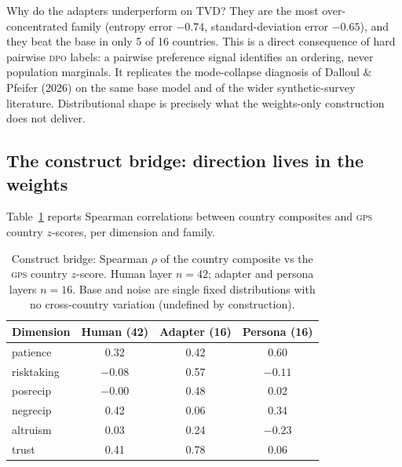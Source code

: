 \documentclass[10pt,letterpaper]{article}
\newcommand{\GPS}{\textsc{gps}}
\newcommand{\DPO}{\textsc{dpo}}
\begin{document}
Why do the adapters underperform on TVD? They are the most over-concentrated family (entropy error $-0.74$, standard-deviation error $-0.65$), and they beat the base in only 5 of 16 countries. This is a direct consequence of hard pairwise \DPO{} labels: a pairwise preference signal identifies an ordering, never population marginals. It replicates the mode-collapse diagnosis of Dalloul \& Pfeifer (2026) on the same base model and of the wider synthetic-survey literature. Distributional shape is precisely what the weights-only construction does not deliver.

\subsection{The construct bridge: direction lives in the weights}
Table~\ref{tab:res-bridge} reports Spearman correlations between country composites and \GPS{} country $z$-scores, per dimension and family.

\begin{table}[H]
\centering\small
\caption{Construct bridge: Spearman $\rho$ of the country composite vs the \GPS{} country $z$-score. Human layer $n=42$; adapter and persona layers $n=16$. Base and noise are single fixed distributions with no cross-country variation (undefined by construction).}\label{tab:res-bridge}
\begin{tabular}{lccc}
\toprule
Dimension & Human (42) & Adapter (16) & Persona (16)\\
\midrule
patience & 0.32 & 0.42 & 0.60\\
risktaking & $-0.08$ & 0.57 & $-0.11$\\
posrecip & $-0.00$ & 0.48 & 0.02\\
negrecip & 0.42 & 0.06 & 0.34\\
altruism & 0.03 & 0.24 & $-0.23$\\
trust & 0.41 & 0.78 & 0.06\\
\bottomrule
\end{tabular}
\end{table}
\end{document}
